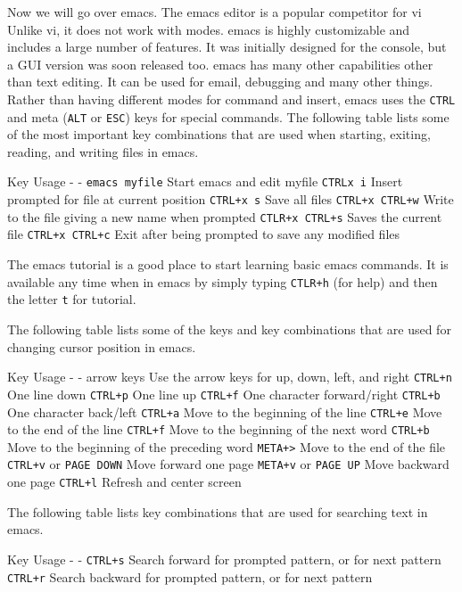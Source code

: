 Now we will go over emacs. The emacs editor is a popular competitor for
vi Unlike vi, it does not work with modes. emacs is highly customizable
and includes a large number of features. It was initially designed for
the console, but a GUI version was soon released too. emacs has many
other capabilities other than text editing. It can be used for email,
debugging and many other things. Rather than having different modes for
command and insert, emacs uses the \texttt{CTRL} and meta (\texttt{ALT}
or \texttt{ESC}) keys for special commands. The following table lists
some of the most important key combinations that are used when starting,
exiting, reading, and writing files in emacs.

Key \textbar{} Usage - \textbar{} - \texttt{emacs myfile} \textbar{}
Start emacs and edit myfile \texttt{CTRLx i} \textbar{} Insert prompted
for file at current position \texttt{CTRL+x s} \textbar{} Save all files
\texttt{CTRL+x CTRL+w} \textbar{} Write to the file giving a new name
when prompted \texttt{CTLR+x CTRL+s} \textbar{} Saves the current file
\texttt{CTRL+x CTRL+c} \textbar{} Exit after being prompted to save any
modified files

The emacs tutorial is a good place to start learning basic emacs
commands. It is available any time when in emacs by simply typing
\texttt{CTLR+h} (for help) and then the letter \texttt{t} for tutorial.

The following table lists some of the keys and key combinations that are
used for changing cursor position in emacs.

Key \textbar{} Usage - \textbar{} - arrow keys \textbar{} Use the arrow
keys for up, down, left, and right \texttt{CTRL+n} \textbar{} One line
down \texttt{CTRL+p} \textbar{} One line up \texttt{CTRL+f} \textbar{}
One character forward/right \texttt{CTRL+b} \textbar{} One character
back/left \texttt{CTRL+a} \textbar{} Move to the beginning of the line
\texttt{CTRL+e} \textbar{} Move to the end of the line \texttt{CTRL+f}
\textbar{} Move to the beginning of the next word \texttt{CTRL+b}
\textbar{} Move to the beginning of the preceding word
\texttt{META+\textgreater{}} \textbar{} Move to the end of the file
\texttt{CTRL+v} or \texttt{PAGE DOWN} \textbar{} Move forward one page
\texttt{META+v} or \texttt{PAGE UP} \textbar{} Move backward one page
\texttt{CTRL+l} \textbar{} Refresh and center screen

The following table lists key combinations that are used for searching
text in emacs.

Key \textbar{} Usage - \textbar{} - \texttt{CTRL+s} \textbar{} Search
forward for prompted pattern, or for next pattern \texttt{CTRL+r}
\textbar{} Search backward for prompted pattern, or for next pattern

